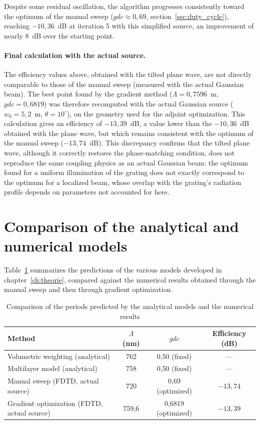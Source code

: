 \documentclass[a4paper,11pt]{report}
\begin{document}
Despite some residual oscillation, the algorithm progresses consistently toward the optimum of the manual sweep ($gdc\approx0{,}69$, section~\ref{sec:duty_cycle}), reaching $-10{,}36$~dB at iteration 5 with this simplified source, an improvement of nearly 8~dB over the starting point.

\paragraph{Final calculation with the actual source.} The efficiency values above, obtained with the tilted plane wave, are not directly comparable to those of the manual sweep (measured with the actual Gaussian beam). The best point found by the gradient method ($\Lambda=0{,}7596$~\textmu m, $gdc=0{,}6819$) was therefore recomputed with the actual Gaussian source ($w_0=5{,}2$~\textmu m, $\theta=10^\circ$), on the geometry used for the adjoint optimization. This calculation gives an efficiency of $-13{,}39$~dB, a value lower than the $-10{,}36$~dB obtained with the plane wave, but which remains consistent with the optimum of the manual sweep ($-13{,}74$~dB). This discrepancy confirms that the tilted plane wave, although it correctly restores the phase-matching condition, does not reproduce the same coupling physics as an actual Gaussian beam: the optimum found for a uniform illumination of the grating does not exactly correspond to the optimum for a localized beam, whose overlap with the grating's radiation profile depends on parameters not accounted for here.

\section{Comparison of the analytical and numerical models}

Table~\ref{tab:comparaison_finale} summarizes the predictions of the various models developed in chapter~\ref{ch:theorie}, compared against the numerical results obtained through the manual sweep and then through gradient optimization.

\begin{table}[h]
\centering
\begin{tabular}{lccc}
\hline
Method & $\Lambda$ (nm) & $gdc$ & Efficiency (dB) \\
\hline
Volumetric weighting (analytical) & 762 & 0,50 (fixed) & --- \\
Multilayer model (analytical) & 758 & 0,50 (fixed) & --- \\
Manual sweep (FDTD, actual source) & 720 & 0,69 (optimized) & $-13,74$ \\
Gradient optimization (FDTD, actual source) & 759,6 & 0,6819 (optimized) & $-13,39$ \\
\hline
\end{tabular}
\caption{Comparison of the periods predicted by the analytical models and the numerical results}
\label{tab:comparaison_finale}
\end{table}
\end{document}
